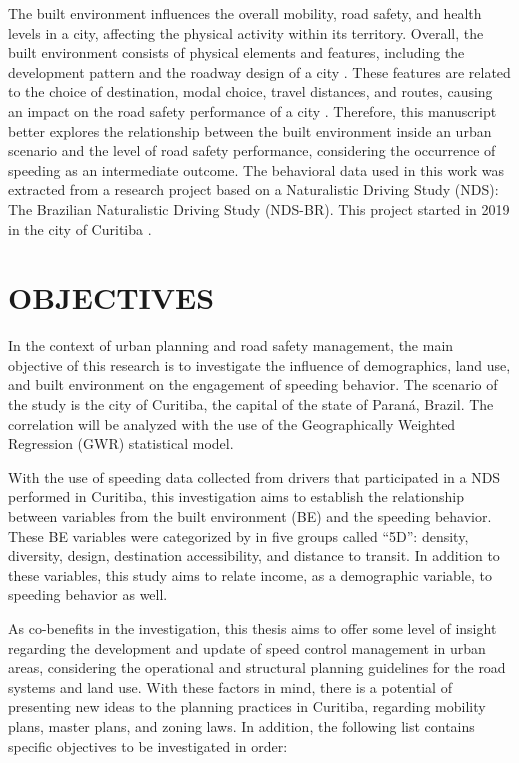 The built environment influences the overall mobility, road safety, and health levels in a city, affecting the physical activity within its territory. Overall, the built environment consists of physical elements and features, including the development pattern and the roadway design of a city \cite{Ewing2010}. These features are related to the choice of destination, modal choice, travel distances, and routes, causing an impact on the road safety performance of a city \cite{Tiwari}. Therefore, this manuscript better explores the relationship between the built environment inside an urban scenario and the level of road safety performance, considering the occurrence of speeding as an intermediate outcome. The behavioral data used in this work was extracted from a research project based on a Naturalistic Driving Study (NDS): The Brazilian Naturalistic Driving Study (NDS-BR). This project started in 2019 in the city of Curitiba \cite{ceppur_estudo_2021}. 

\section{OBJECTIVES} \label{sec:obj}

In the context of urban planning and road safety management, the main objective of this research is to investigate the influence of demographics, land use, and built environment on the engagement of speeding behavior. The scenario of the study is the city of Curitiba, the capital of the state of Paraná, Brazil. The correlation will be analyzed with the use of the Geographically Weighted Regression (GWR) statistical model.

With the use of speeding data collected from drivers that participated in a NDS performed in Curitiba, this investigation aims to establish the relationship between variables from the built environment (BE) and the speeding behavior. These BE variables were categorized by \textcite{Ewing2009} in five groups called ``5D'': density, diversity, design, destination accessibility, and distance to transit. In addition to these variables, this study aims to relate income, as a demographic variable, to speeding behavior as well.

As co-benefits in the investigation, this thesis aims to offer some level of insight regarding the development and update of speed control management in urban areas, considering the operational and structural planning guidelines for the road systems and land use. With these factors in mind, there is a potential of presenting new ideas to the planning practices in Curitiba, regarding mobility plans, master plans, and zoning laws. In addition, the following list contains specific objectives to be investigated in order:

